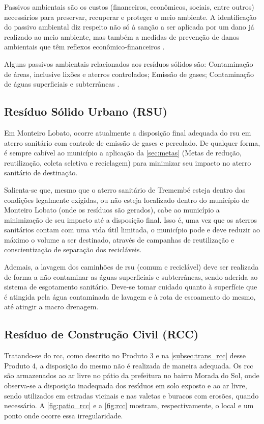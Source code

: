 Passivos ambientais são os custos (financeiros, econômicos, sociais, entre outros) necessários para preservar, recuperar e proteger o meio ambiente. A identificação do passivo ambiental diz respeito não só à sanção a ser aplicada por um dano já realizado ao meio ambiente, mas também a medidas de prevenção de danos ambientais que têm reflexos econômico-financeiros \cite{agevap_manual_2019}.

Alguns passivos ambientais relacionados aos resíduos sólidos são: Contaminação de áreas, inclusive lixões e aterros controlados; Emissão de gases; Contaminação de águas superficiais e subterrâneas \cite{agevap_manual_2019}.

\subsection{Resíduo Sólido Urbano (RSU)}
Em Monteiro Lobato, ocorre atualmente a disposição final adequada do \gls{rsu} em aterro sanitário com controle de emissão de gases e percolado. De qualquer forma, é sempre cabível ao município a aplicação da \autoref{sec:metas} (Metas de redução, reutilização, coleta seletiva e reciclagem) para minimizar seu impacto no aterro sanitário de destinação.

Salienta-se que, mesmo que o aterro sanitário de Tremembé esteja dentro das condições legalmente exigidas, ou não esteja localizado dentro do município de Monteiro Lobato (onde os resíduos são gerados), cabe ao município a minimização de seu impacto até a disposição final. Isso é, uma vez que os aterros sanitários contam com uma vida útil limitada, o município pode e deve reduzir ao máximo o volume a ser destinado, através de campanhas de reutilização e conscientização de separação dos recicláveis.

Ademais, a lavagem dos caminhões de \gls{rsu} (comum e reciclável) deve ser realizada de forma a não contaminar as águas superficiais e subterrâneas, sendo aderida ao sistema de esgotamento sanitário. Deve-se tomar cuidado quanto à superfície que é atingida pela água contaminada de lavagem e à rota de escoamento do mesmo, até atingir a macro drenagem.


\subsection{Resíduo de Construção Civil (RCC)}
Tratando-se do \gls{rcc}, como descrito no Produto 3 e na \autoref{subsec:trans_rcc} desse Produto 4, a disposição do mesmo não é realizada de maneira adequada. Os \gls{rcc} são armazenados ao ar livre no pátio da prefeitura no bairro Morada do Sol,  onde observa-se a disposição inadequada dos resíduos em solo exposto e ao ar livre, sendo utilizados em estradas vicinais e nas valetas e buracos com erosões, quando necessário. A \autoref{fig:patio_rcc} e a \autoref{fig:rcc} mostram, respectivamente, o local e um ponto onde ocorre essa irregularidade.

